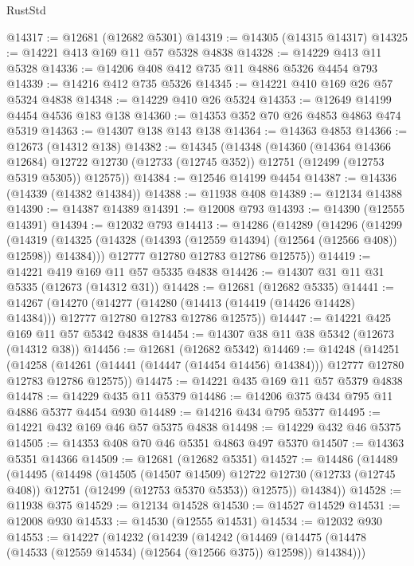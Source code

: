 \begin{lexlean}{RustStd}
\begin{coremodule}
@14317 := @12681 (@12682 @5301)
@14319 := @14305 (@14315 @14317)
@14325 := @14221 @413 @169 @11 @57 @5328 @4838
@14328 := @14229 @413 @11 @5328
@14336 := @14206 @408 @412 @735 @11 @4886 @5326 @4454 @793
@14339 := @14216 @412 @735 @5326
@14345 := @14221 @410 @169 @26 @57 @5324 @4838
@14348 := @14229 @410 @26 @5324
@14353 := @12649 @14199 @4454 @4536 @183 @138
@14360 := @14353 @352 @70 @26 @4853 @4863 @474 @5319
@14363 := @14307 @138 @143 @138
@14364 := @14363 @4853
@14366 := @12673 (@14312 @138)
@14382 := @14345
    (@14348
      (@14360
        (@14364 @14366 @12684)
        @12722
        @12730
        (@12733 (@12745 @352))
        @12751
        (@12499 (@12753 @5319 @5305))
        @12575))
@14384 := @12546 @14199 @4454
@14387 := @14336 (@14339 (@14382 @14384))
@14388 := @11938 @408
@14389 := @12134 @14388
@14390 := @14387 @14389
@14391 := @12008 @793
@14393 := @14390 (@12555 @14391)
@14394 := @12032 @793
@14413 := @14286
    (@14289
      (@14296
        (@14299
          (@14319 (@14325 (@14328 (@14393 (@12559 @14394) (@12564 (@12566 @408)) @12598)) @14384)))
        @12777
        @12780
        @12783
        @12786
        @12575))
@14419 := @14221 @419 @169 @11 @57 @5335 @4838
@14426 := @14307 @31 @11 @31 @5335 (@12673 (@14312 @31))
@14428 := @12681 (@12682 @5335)
@14441 := @14267
    (@14270
      (@14277 (@14280 (@14413 (@14419 (@14426 @14428) @14384))) @12777 @12780 @12783 @12786 @12575))
@14447 := @14221 @425 @169 @11 @57 @5342 @4838
@14454 := @14307 @38 @11 @38 @5342 (@12673 (@14312 @38))
@14456 := @12681 (@12682 @5342)
@14469 := @14248
    (@14251
      (@14258 (@14261 (@14441 (@14447 (@14454 @14456) @14384))) @12777 @12780 @12783 @12786 @12575))
@14475 := @14221 @435 @169 @11 @57 @5379 @4838
@14478 := @14229 @435 @11 @5379
@14486 := @14206 @375 @434 @795 @11 @4886 @5377 @4454 @930
@14489 := @14216 @434 @795 @5377
@14495 := @14221 @432 @169 @46 @57 @5375 @4838
@14498 := @14229 @432 @46 @5375
@14505 := @14353 @408 @70 @46 @5351 @4863 @497 @5370
@14507 := @14363 @5351 @14366
@14509 := @12681 (@12682 @5351)
@14527 := @14486
    (@14489
      (@14495
        (@14498
          (@14505
            (@14507 @14509)
            @12722
            @12730
            (@12733 (@12745 @408))
            @12751
            (@12499 (@12753 @5370 @5353))
            @12575))
        @14384))
@14528 := @11938 @375
@14529 := @12134 @14528
@14530 := @14527 @14529
@14531 := @12008 @930
@14533 := @14530 (@12555 @14531)
@14534 := @12032 @930
@14553 := @14227
    (@14232
      (@14239
        (@14242
          (@14469 (@14475 (@14478 (@14533 (@12559 @14534) (@12564 (@12566 @375)) @12598)) @14384)))

\end{coremodule}
\end{lexlean}
